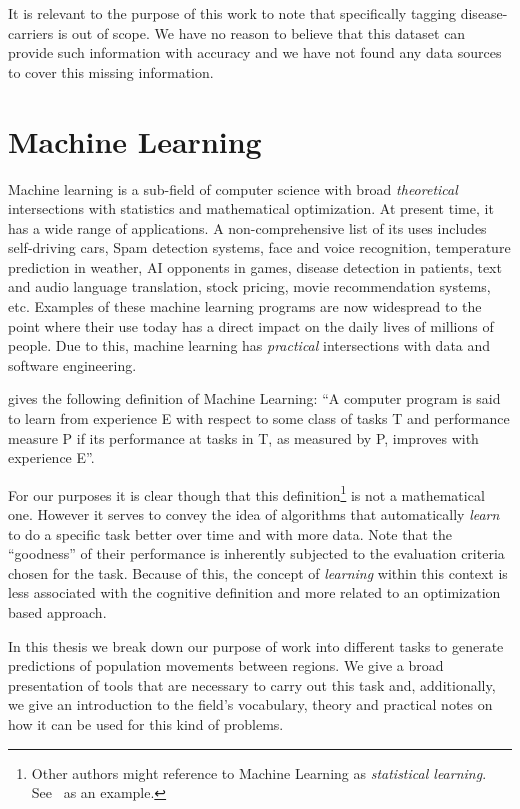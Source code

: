 It is relevant to the purpose of this work to note that specifically tagging disease-carriers is out of scope.
We have no reason to believe that this dataset can provide such information with accuracy and we have not found any data sources to cover this missing  information.

\section{Machine Learning}

Machine learning is a sub-field of computer science with broad \textit{theoretical} intersections with statistics and mathematical optimization.
At present time, it has a wide range of applications.
A non-comprehensive list of its uses includes self-driving cars, Spam detection systems, face and voice recognition, temperature prediction in weather, AI opponents in games, disease detection in patients, text and audio language translation, stock pricing, movie recommendation systems, etc.
Examples of these machine learning programs are now widespread to the point where their use today has a direct impact on the daily lives of millions of people.
Due to this, machine learning has \textit{practical} intersections with data and software engineering.


\citep{Mitchell-MLearning} gives the following definition of Machine Learning:
``A computer program is said to learn from experience E with respect to some class of tasks T and performance measure P if its performance at tasks in T, as measured by P, improves with experience E''.

For our purposes it is clear though that this definition\footnote{Other authors might reference to Machine Learning as \textit{statistical learning}. See~\citep{hastie-elemstatslearn} as an example.} is not a mathematical one.
However it serves to convey the idea of algorithms that automatically \textit{learn} to do a specific task better over time and with more data.
Note that the ``goodness'' of their performance is inherently subjected to the evaluation criteria chosen for the task.
Because of this, the concept of \textit{learning} within this context is less associated with the cognitive definition and more related to an optimization based approach.

In this thesis we break down our purpose of work into different tasks to generate predictions of population movements between regions.
We give a broad presentation of tools that are necessary to carry out this task and, additionally, we give an introduction to the field's vocabulary, theory and practical notes on how it can be used for this kind of problems.

